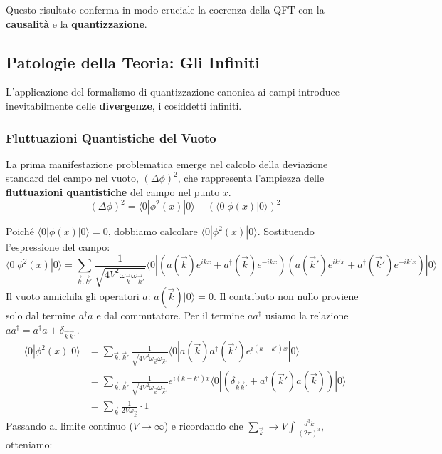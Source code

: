 Questo risultato conferma in modo cruciale la coerenza della QFT con la \textbf{causalità} e la \textbf{quantizzazione}.

\subsection{Patologie della Teoria: Gli Infiniti}

L'applicazione del formalismo di quantizzazione canonica ai campi introduce inevitabilmente delle \textbf{divergenze}, i cosiddetti infiniti.

\subsubsection{Fluttuazioni Quantistiche del Vuoto}

La prima manifestazione problematica emerge nel calcolo della deviazione standard del campo nel vuoto, $(\Delta\phi)^2$, che rappresenta l'ampiezza delle \textbf{fluttuazioni quantistiche} del campo nel punto $x$.
\begin{equation}
(\Delta\phi)^2 = \langle 0 | \phi^2(x) | 0 \rangle - (\langle 0 | \phi(x) | 0 \rangle)^2
\end{equation}

Poiché $\langle 0 | \phi(x) | 0 \rangle = 0$, dobbiamo calcolare $\langle 0 | \phi^2(x) | 0 \rangle$.
Sostituendo l'espressione del campo:
$$
\langle 0 | \phi^2(x) | 0 \rangle = \sum_{\vec{k},\vec{k}'} \frac{1}{\sqrt{4V^2 \omega_{\vec{k}}\omega_{\vec{k}'}}} \langle 0 | \left( a(\vec{k})e^{ikx} + a^{\dagger}(\vec{k})e^{-ikx} \right) \left( a(\vec{k}')e^{ik'x} + a^{\dagger}(\vec{k}')e^{-ik'x} \right) | 0 \rangle
$$
Il vuoto annichila gli operatori $a$: $a(\vec{k})|0\rangle = 0$. Il contributo non nullo proviene solo dal termine $a^{\dagger}a$ e dal commutatore. Per il termine $a a^{\dagger}$ usiamo la relazione $a a^{\dagger} = a^{\dagger} a + \delta_{\vec{k}\vec{k}'}$.
\begin{align*}
\langle 0 | \phi^2(x) | 0 \rangle &= \sum_{\vec{k},\vec{k}'} \frac{1}{\sqrt{4V^2 \omega_{\vec{k}}\omega_{\vec{k}'}}} \langle 0 | a(\vec{k}) a^{\dagger}(\vec{k}') e^{i(k-k')x} | 0 \rangle \\
&= \sum_{\vec{k},\vec{k}'} \frac{1}{\sqrt{4V^2 \omega_{\vec{k}}\omega_{\vec{k}'}}} e^{i(k-k')x} \langle 0 | (\delta_{\vec{k}\vec{k}'} + a^{\dagger}(\vec{k}')a(\vec{k})) | 0 \rangle \\
&= \sum_{\vec{k}} \frac{1}{2V\omega_{\vec{k}}} \cdot 1
\end{align*}
Passando al limite continuo ($V \to \infty$) e ricordando che $\sum_{\vec{k}} \to V \int \frac{d^3k}{(2\pi)^3}$, otteniamo:

